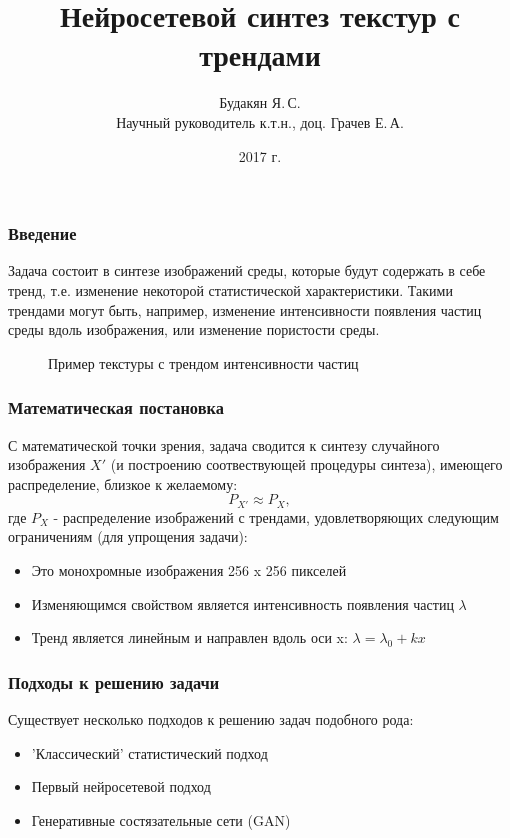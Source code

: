 \documentclass[9pt]{beamer}
\begin{document}
\title{Нейросетевой синтез текстур с трендами}
\author{Будакян Я.\,С. \\ Научный руководитель к.т.н., доц. Грачев Е.\,А.}
\date{2017 г.} 

\maketitle

\begin{frame}\frametitle{Введение}
	Задача состоит в синтезе изображений среды, которые будут содержать в себе тренд, т.е. изменение некоторой статистической характеристики. Такими трендами могут быть, например, изменение интенсивности появления частиц среды вдоль изображения, или изменение пористости среды. \\
	\begin{figure}
		\caption{Пример текстуры с трендом интенсивности частиц}
	\end{figure}
\end{frame}

\begin{frame}\frametitle{Математическая постановка}
	С математической точки зрения, задача сводится к синтезу случайного изображения $X'$ (и построению соотвествующей процедуры синтеза), имеющего распределение, близкое к желаемому:
	$$ P_{X'} \approx P_X,$$
	где $P_X$ - распределение изображений с трендами, удовлетворяющих следующим ограничениям (для упрощения задачи):
	\begin{itemize}
		\item Это монохромные изображения 256 x 256 пикселей
		\item Изменяющимся свойством является интенсивность появления частиц $\lambda$
		\item Тренд является линейным и направлен вдоль оси x: 
		$ \lambda = \lambda_0 + kx $
	\end{itemize}
\end{frame}

\begin{frame}\frametitle{Подходы к решению задачи}
	Существует несколько подходов к решению задач подобного рода:
	\begin{itemize}
		\item 'Классический' статистический подход
		\item Первый нейросетевой подход
		\item Генеративные состязательные сети (GAN)
	\end{itemize}
\end{frame}
\end{document}
